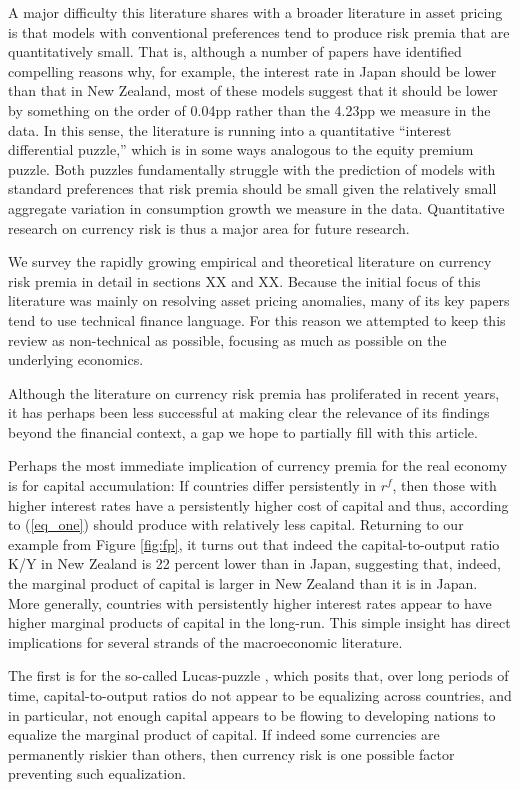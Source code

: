 \documentclass[12pt,letter]{article}
\theoremstyle{break} \theorembodyfont{\normalfont\itshape}
\theoremstyle{break}
\theoremstyle{break} \theorembodyfont{\normalfont\itshape}
\theoremstyle{break} \theorembodyfont{\normalfont\itshape}
\begin{document}
A major difficulty this literature shares with a broader literature in
asset pricing is that models with conventional preferences tend to
produce risk premia that are quantitatively small. That is, although a
number of papers have identified compelling reasons why, for example,
the interest rate in Japan should be lower than that in New Zealand,
most of these models suggest that it should be lower by something on
the order of 0.04pp rather than the 4.23pp we measure in the data. In
this sense, the literature is running into a quantitative ``interest
differential puzzle,'' which is in some ways analogous to the equity
premium puzzle. Both puzzles fundamentally struggle with the
prediction of models with standard preferences that risk premia should
be small given the relatively small aggregate variation in consumption
growth we measure in the data. Quantitative research on currency risk
is thus a major area for future research.

We survey the rapidly growing empirical and theoretical literature on
currency risk premia in detail in sections XX and XX. Because the
initial focus of this literature was mainly on resolving asset pricing
anomalies, many of its key papers tend to use technical finance language.
For this reason we attempted to keep this review as non-technical as
possible, focusing as much as possible on the underlying economics.

Although the literature on currency risk premia has proliferated in
recent years, it has perhaps been less successful at making clear the
relevance of its findings beyond the financial context, a gap we hope to
partially fill with this article.

Perhaps the most immediate implication of currency premia for the real
economy is for capital accumulation: If countries differ persistently
in $r^f$, then those with higher interest rates have a persistently
higher cost of capital and thus, according to (\ref{eq_one}) should
produce with relatively less capital. Returning to our example from
Figure \ref{fig:fp}, it turns out that indeed the capital-to-output ratio K/Y in
New Zealand is 22 percent lower than in Japan, suggesting that,
indeed, the marginal product of capital is larger in New Zealand than
it is in Japan. More generally, countries with persistently higher
interest rates appear to have higher marginal products of capital in
the long-run. This simple insight has direct implications for several
strands of the macroeconomic literature.

The first is for the so-called Lucas-puzzle \citep{Lucas1988}, which
posits that, over long periods of time, capital-to-output ratios do not appear to be equalizing across countries, and in particular, not enough capital appears to be flowing to developing nations to equalize the marginal product of capital. If indeed some currencies are permanently riskier than others, then currency risk is one possible factor preventing such equalization.
\end{document}
